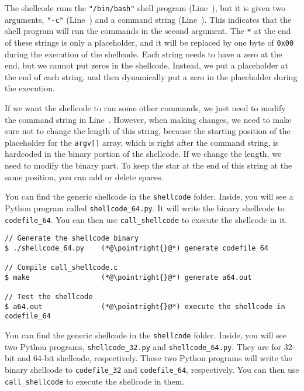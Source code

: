The shellcode runs the \texttt{"/bin/bash"} shell program (Line~),
but it is given two arguments, \texttt{"-c"} (Line~) and
a command string (Line~). This indicates that the shell program
will run the commands in the second argument.
The \texttt{*} at the end of these strings is only a placeholder,
and it will be replaced by
one byte of \texttt{0x00} during the execution of the shellcode.
Each string needs to have a zero at the end, but we cannot put
zeros in the shellcode. Instead, we put a placeholder at the end of each string,
and then dynamically put a zero in the placeholder during the
execution.

If we want the shellcode to run some other commands,
we just need to modify the command string in Line~.
However, when making changes, we need to
make sure not to change the length of this string, because the
starting position of the placeholder for the \texttt{argv[]} array,
which is right after the command string,
is hardcoded in the binary portion of the shellcode. If
we change the length, we need to modify the binary part.
To keep the star at the end of this string at the same position,
you can add or delete spaces.



\ifdefined\arm
You can find the generic shellcode in the \texttt{shellcode} folder.
Inside, you will see a Python program called \texttt{shellcode\_64.py}. 
It will write the binary shellcode to \texttt{codefile\_64}.
You can then use 
\texttt{call\_shellcode} to execute the shellcode in it. 

\begin{lstlisting}
// Generate the shellcode binary 
$ ./shellcode_64.py    (*@\pointright{}@*) generate codefile_64

// Compile call_shellcode.c
$ make                 (*@\pointright{}@*) generate a64.out 

// Test the shellcode 
$ a64.out              (*@\pointright{}@*) execute the shellcode in codefile_64
\end{lstlisting}

\else 
You can find the generic shellcode in the \texttt{shellcode} folder.
Inside, you will see two Python programs, 
\texttt{shellcode\_32.py} and \texttt{shellcode\_64.py}. 
They are for 32-bit and 64-bit shellcode, respectively. 
These two Python programs will
write the binary shellcode to \texttt{codefile\_32}
and \texttt{codefile\_64}, respectively. You can then use 
\texttt{call\_shellcode} to execute the shellcode in them. 

